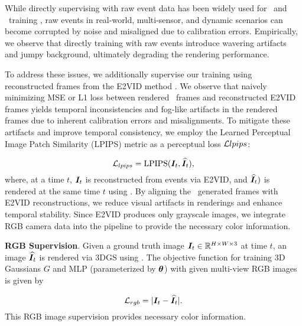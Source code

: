 While directly supervising with raw event data has been widely used for \gs~and \nerf~training \cite{klenk2023nerf, rudnev2023eventnerf, low2023robust, xiong2024event3dgs}, raw events in real-world, multi-sensor, and dynamic scenarios can become corrupted by noise and misaligned due to calibration errors. 
Empirically, we observe that directly training with raw events introduce wavering artifacts and jumpy background, ultimately degrading the rendering performance. 







To address these issues, we additionally supervise our training using reconstructed frames from the E2VID method \cite{rebecq2019high}. 
We observe that naively minimizing MSE or L1 loss between rendered \gs~frames and reconstructed E2VID frames yields temporal inconsistencies and fog-like artifacts in the rendered frames due to inherent calibration errors and misalignments.
To mitigate these artifacts and improve temporal consistency, we employ the Learned Perceptual Image Patch Similarity (LPIPS) metric \cite{zhang2018unreasonable} as a perceptual loss $\mathcal{L}{lpips}$:

\begin{equation} 
\mathcal{L}_{lpips} = \text{LPIPS}(\bm{I}_t, \widehat{\bm{I}}_t),
\end{equation}
where, at a time $t$, $\bm{I}_t$ is reconstructed from events via E2VID, and $\widehat{\bm{I}}_t)$ is rendered at the same time $t$ using \equationautorefname{\ref{alpha_blending}}. 
By aligning the \gs~generated frames with E2VID reconstructions, we reduce visual artifacts in renderings and enhance temporal stability.
Since E2VID produces only grayscale images, we integrate RGB camera data into the pipeline to provide the necessary color information.

\vspace{1mm}
\noindent 
\textbf{RGB Supervision}.
Given a ground truth image $\bm{I}_t\in\mathbb{R}^{H\times W\times 3}$ at time $t$, an image $\widehat{\bm{I}}_t$ is rendered via 3DGS using \equationautorefname{~\ref{alpha_blending}}. The objective function for training 3D Gaussians $G$ and MLP (parameterized by ${\bm{\theta}}$) with given multi-view RGB images is given by

\begin{equation}
\mathcal{L}_{rgb} = |\bm{I}_t-\widehat{\bm{I}}_t|.
\end{equation}
\noindent
This RGB image supervision provides necessary color information. 





